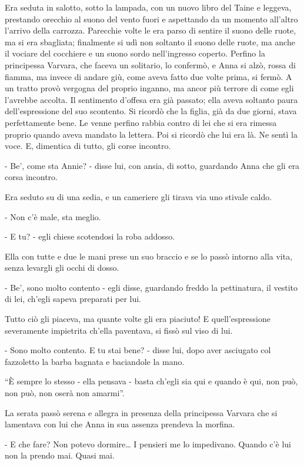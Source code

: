 Era seduta in salotto, sotto la lampada, con un nuovo libro del Taine e leggeva, prestando orecchio al suono del vento fuori e aspettando da un momento all'altro l'arrivo della carrozza. Parecchie volte le era parso di sentire il suono delle ruote, ma si era sbagliata; finalmente si udì non soltanto il suono delle ruote, ma anche il vociare del cocchiere e un suono sordo nell'ingresso coperto. Perfino la principessa Varvara, che faceva un solitario, lo confermò, e Anna si alzò, rossa di fiamma, ma invece di andare giù, come aveva fatto due volte prima, si fermò. A un tratto provò vergogna del proprio inganno, ma ancor più terrore di come egli l'avrebbe accolta. Il sentimento d'offesa era già passato; ella aveva soltanto paura dell'espressione del suo scontento. Si ricordò che la figlia, già da due giorni, stava perfettamente bene. Le venne perfino rabbia contro di lei che si era rimessa proprio quando aveva mandato la lettera. Poi si ricordò che lui era là. Ne sentì la voce. E, dimentica di tutto, gli corse incontro. 

- Be', come sta Annie? - disse lui, con ansia, di sotto, guardando Anna che gli era corsa incontro. 

Era seduto su di una sedia, e un cameriere gli tirava via uno stivale caldo. 

- Non c'è male, sta meglio. 

- E tu? - egli chiese scotendosi la roba addosso. 

Ella con tutte e due le mani prese un suo braccio e se lo passò intorno alla vita, senza levargli gli occhi di dosso. 

- Be', sono molto contento - egli disse, guardando freddo la pettinatura, il vestito di lei, ch'egli sapeva preparati per lui. 

Tutto ciò gli piaceva, ma quante volte gli era piaciuto! E quell'espressione severamente impietrita ch'ella paventava, si fissò sul viso di lui. 

- Sono molto contento. E tu stai bene? - disse lui, dopo aver asciugato col fazzoletto la barba bagnata e baciandole la mano. 

``È sempre lo stesso - ella pensava - basta ch'egli sia qui e quando è qui, non può, non può, non oserà non amarmi''. 

La serata passò serena e allegra in presenza della principessa Varvara che si lamentava con lui che Anna in sua assenza prendeva la morfina. 

- E che fare? Non potevo dormire\ldots{} I pensieri me lo impedivano. Quando c'è lui non la prendo mai. Quasi mai. 

